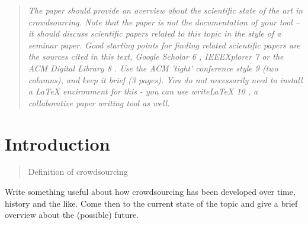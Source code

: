 \documentclass{acm_proc_article-sp}
\begin{document}
\maketitle
\begin{abstract}
\textit{The paper should provide an overview about the scientific state of the art in crowdsourcing. Note
that the paper is not the documentation of your tool – it should discuss scientific papers related
to this topic in the style of a seminar paper. Good starting points for finding related scientific
papers are the sources cited in this text, Google Scholar 6 , IEEEXplorer 7 or the ACM Digital
Library 8 . Use the ACM ’tight’ conference style 9 (two columns), and keep it brief (3 pages). You
do not necessarily need to install a LaTeX environment for this - you can use writeLaTeX 10 , a
collaborative paper writing tool as well.}
\end{abstract}



\section{Introduction}
\label{sect:intro}

\begin{quote} 
  Definition of crowdsourcing
\end{quote}

Write something useful about how crowdsourcing has been developed over time, history and the like.
Come then to the current state of the topic and give a brief overview about the (possible) future.

\end{document}
